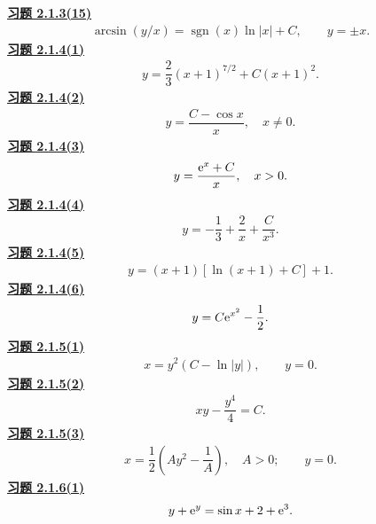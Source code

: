 \noindent\textbf{\hyperref[q:2.1.3(15)]{习题 2.1.3(15)}}
\[\begin{gathered}\arcsin(y/x)=\operatorname{sgn}(x)\ln|x|+C,\qquad y=\pm x.\end{gathered}\]
\noindent\textbf{\hyperref[q:2.1.4(1)]{习题 2.1.4(1)}}
\[\begin{gathered}y=\dfrac23(x+1)^{7/2}+C(x+1)^2.\end{gathered}\]
\noindent\textbf{\hyperref[q:2.1.4(2)]{习题 2.1.4(2)}}
\[\begin{gathered}y=\dfrac{C-\cos x}{x},\quad x\ne0.\end{gathered}\]
\noindent\textbf{\hyperref[q:2.1.4(3)]{习题 2.1.4(3)}}
\[\begin{gathered}y=\dfrac{\mathrm e^x+C}{x},\quad x>0.\end{gathered}\]
\noindent\textbf{\hyperref[q:2.1.4(4)]{习题 2.1.4(4)}}
\[\begin{gathered}y=-\dfrac13+\dfrac2x+\dfrac C{x^3}.\end{gathered}\]
\noindent\textbf{\hyperref[q:2.1.4(5)]{习题 2.1.4(5)}}
\[\begin{gathered}y=(x+1)[\ln(x+1)+C]+1.\end{gathered}\]
\noindent\textbf{\hyperref[q:2.1.4(6)]{习题 2.1.4(6)}}
\[\begin{gathered}y=C\mathrm e^{x^2}-\dfrac12.\end{gathered}\]
\noindent\textbf{\hyperref[q:2.1.5(1)]{习题 2.1.5(1)}}
\[\begin{gathered}x=y^2(C-\ln|y|),\qquad y=0.\end{gathered}\]
\noindent\textbf{\hyperref[q:2.1.5(2)]{习题 2.1.5(2)}}
\[\begin{gathered}xy-\dfrac{y^4}{4}=C.\end{gathered}\]
\noindent\textbf{\hyperref[q:2.1.5(3)]{习题 2.1.5(3)}}
\[\begin{gathered}x=\dfrac12\left(Ay^2-\dfrac1A\right),\quad A>0;\qquad y=0.\end{gathered}\]
\noindent\textbf{\hyperref[q:2.1.6(1)]{习题 2.1.6(1)}}
\[\begin{gathered}y+\mathrm e^y=\sin x+2+\mathrm e^3.\end{gathered}\]
